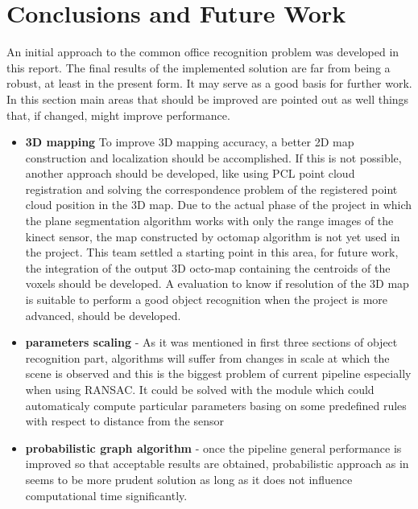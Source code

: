 \documentclass[fontsize=12pt]{article}
\begin{document}
\section{Conclusions and Future Work}
\label{sec:Future Work}
An initial approach to the common office recognition problem was developed in this report. The final results of the implemented solution are far from being a robust, at least in the present form. It may serve as a good basis for further work. In this section main areas that should be improved are pointed out as well things that, if changed, might improve performance.
\begin{itemize}
\item \textbf{3D mapping} To improve 3D mapping accuracy, a better 2D map construction and localization should be accomplished. If this is not possible, another approach should be developed,  like using PCL point cloud registration and solving the correspondence problem of the registered point cloud position in the 3D map. Due to the actual phase of the project in which the plane segmentation algorithm works with only the range images of the kinect sensor, the  map constructed by octomap algorithm is not yet used in the project. This team settled a starting point in this area, for future work, the integration of the output 3D octo-map containing the centroids of the voxels should be developed. A evaluation to know if  resolution of the 3D map  is suitable to perform a good object recognition when the project is more advanced, should be developed.
  \item \textbf{parameters scaling} - As it was mentioned in first three sections of object recognition part, algorithms will suffer from changes in scale at which the scene is observed and this is the biggest problem of current pipeline especially when using RANSAC. It could be solved with the module which could automaticaly compute particular parameters basing on some predefined rules with respect to distance from the sensor
  \item \textbf{probabilistic graph algorithm} - once the pipeline general performance is improved so that acceptable results are obtained, probabilistic approach as in \cite{pap1} seems to be more prudent solution as long as it does not influence computational time significantly.
\end{itemize}
\end{document}
